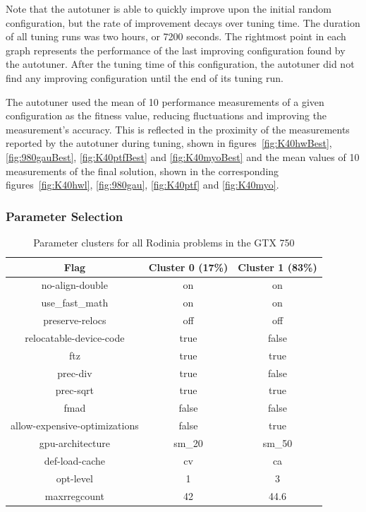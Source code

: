 Note that the autotuner is able to quickly improve upon the initial random
configuration, but the rate of improvement decays over tuning time. The
duration of all tuning runs was two hours, or 7200 seconds.  The rightmost
point in each graph represents the performance of the last improving
configuration found by the autotuner. After the tuning time of this
configuration, the autotuner did not find any improving configuration until the
end of its tuning run.

The autotuner used the mean of 10 performance measurements of a given
configuration as the fitness value, reducing fluctuations and improving the
measurement's accuracy. This is reflected in the proximity of the measurements
reported by the autotuner during tuning, shown in figures~\ref{fig:K40hwBest},
\ref{fig:980gauBest}, \ref{fig:K40ptfBest} and \ref{fig:K40myoBest} and the
mean values of 10 measurements of the final solution, shown in the
corresponding figures~\ref{fig:K40hwl}, \ref{fig:980gau}, \ref{fig:K40ptf} and
\ref{fig:K40myo}.

\subsubsection{Parameter Selection}

\begin{table}[htpb]
    \centering
    \footnotesize
    \begin{tabular}{ccc}
        \toprule
        \textbf{Flag} & \textbf{Cluster 0 (17\%)} & \textbf{Cluster 1 (83\%)} \\\midrule
        no-align-double               & on     & on     \\\midrule
        use\_fast\_math               & on     & on     \\\midrule
        preserve-relocs               & off    & off    \\\midrule
        relocatable-device-code       & true   & false  \\\midrule
        ftz                           & true   & true   \\\midrule
        prec-div                      & true   & false  \\\midrule
        prec-sqrt                     & true   & true   \\\midrule
        fmad                          & false  & false  \\\midrule
        allow-expensive-optimizations & false  & true   \\\midrule
        gpu-architecture              & sm\_20 & sm\_50 \\\midrule
        def-load-cache                & cv     & ca     \\\midrule
        opt-level                     & 1      & 3      \\\midrule
        maxrregcount                  & 42     & 44.6   \\\bottomrule
        \end{tabular}
    \caption{Parameter clusters for all Rodinia problems in the GTX 750}
    \label{tab:750RodiniaClusters}
\end{table}

